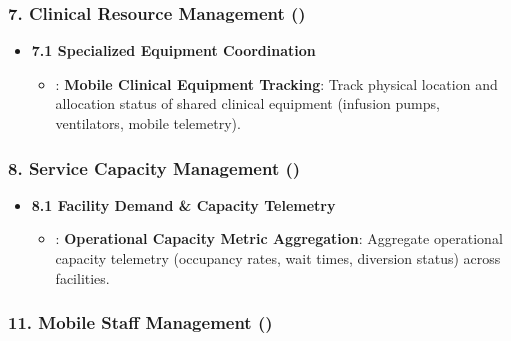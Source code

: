 \subsubsection*{7. Clinical Resource Management (\texttt{})}
\label{rad:enabling:513}

\begin{itemize}

\item 
\textbf{7.1 Specialized Equipment Coordination}


\begin{itemize}

\item 
\texttt{}: \textbf{Mobile Clinical Equipment Tracking}: Track physical location and allocation status of shared clinical equipment (infusion pumps, ventilators, mobile telemetry).



\end{itemize}


\end{itemize}
\label{rad:enabling:516}
\subsubsection*{8. Service Capacity Management (\texttt{})}
\label{rad:enabling:517}

\begin{itemize}

\item 
\textbf{8.1 Facility Demand \& Capacity Telemetry}


\begin{itemize}

\item 
\texttt{}: \textbf{Operational Capacity Metric Aggregation}: Aggregate operational capacity telemetry (occupancy rates, wait times, diversion status) across facilities.



\end{itemize}


\end{itemize}
\label{rad:enabling:520}
\subsubsection*{11. Mobile Staff Management (\texttt{})}
\label{rad:enabling:521}

